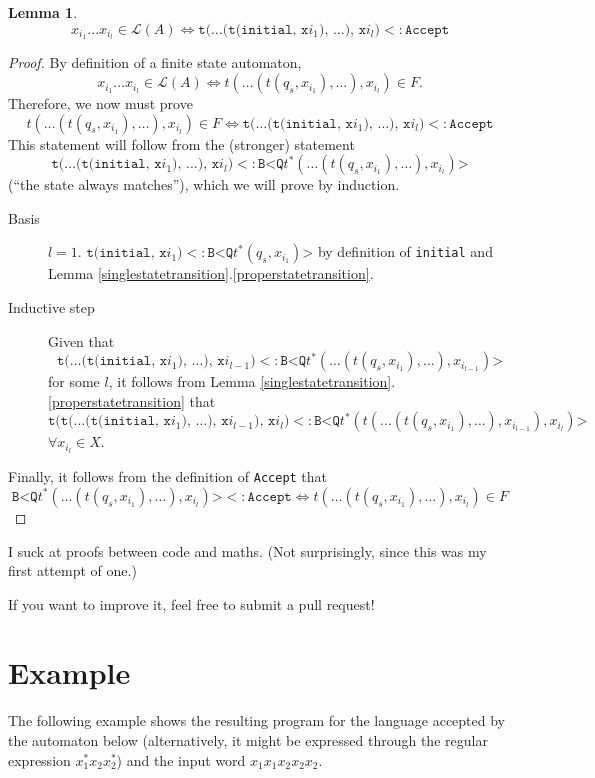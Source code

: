 \documentclass[a4paper, 11pt]{article}
\newcommand{\code}[1]{\texttt{#1}}
\theoremstyle{definition}
\newtheorem{lemma}{Lemma}
\begin{document}
\begin{lemma}\label{statetransitions}
\[
x_{i_1}\ldots x_{i_l} \in \mathcal{L}(A) \iff \code{t(\ldots (t(initial, x$i_1$), \ldots), x$i_l$)} <: \code{Accept}
\]
\begin{proof}
By definition of a finite state automaton,
\[x_{i_1}\ldots x_{i_l} \in \mathcal{L}(A) \iff t(\ldots (t(q_s, x_{i_1}), \ldots), x_{i_l})\in F.\]
Therefore, we now must prove
\[t(\ldots (t(q_s, x_{i_1}), \ldots), x_{i_l})\in F \iff \code{t(\ldots (t(initial, x$i_1$), \ldots), x$i_l$)} <: \code{Accept}\]
This statement will follow from the (stronger) statement
\[\code{t(\ldots (t(initial, x$i_1$), \ldots), x$i_l$)} <: \code{B<Q}t^\ast(\ldots (t(q_s, x_{i_1}), \ldots), x_{i_l})\code{>}\]
(“the state always matches”), which we will prove by induction.
\begin{description}
\item[Basis] $l=1$. $\code{t(initial, x}i_1\code{)} <: \code{B<Q}t^\ast(q_s, x_{i_1})\code{>}$ by definition of \code{initial} and Lemma \ref{singlestatetransition}.\ref{properstatetransition}.
\item[Inductive step]
Given that 
\[\code{t(\ldots (t(initial, x}i_1\code{), \ldots), x}i_{l-1}\code{)} <: \code{B<Q}t^\ast(\ldots (t(q_s, x_{i_1}), \ldots), x_{i_{l-1}})\code{>}\]
for some $l$, it follows from Lemma \ref{singlestatetransition}.\ref{properstatetransition} that
\[\code{t(t(\ldots (t(initial, x$i_1$), \ldots), x$i_{l-1}$), x$i_l$)} <: \code{B<Q}t^\ast(t(\ldots (t(q_s, x_{i_1}), \ldots), x_{i_{l-1}}), x_{i_l})\code{>}\]
$\forall x_{i_l} \in X$.
\end{description}
Finally, it follows from the definition of \code{Accept} that
\[\code{B<Q}t^\ast(\ldots(t(q_s, x_{i_1}), \ldots), x_{i_l})\code{>}<:\code{Accept} \iff t(\ldots(t(q_s, x_{i_1}), \ldots), x_{i_l}) \in F\]
\end{proof}
I suck at proofs between code and maths. (Not surprisingly, since this was my first attempt of one.)

If you want to improve it, feel free to submit a pull request!
\end{lemma}

\section{Example}
The following example shows the resulting program for the language accepted by the automaton below (alternatively, it might be expressed through the regular expression $x_1^\ast x_2 x_2^\ast$) and the input word $x_1x_1x_2x_2x_2$.
\end{document}

